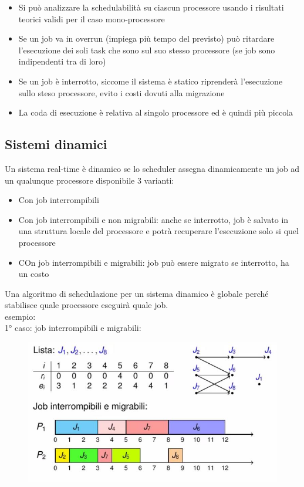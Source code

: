 \documentclass[12pt, oneside]{extbook}
\begin{document}
\begin{itemize}
\item Si può analizzare la schedulabilità su  ciascun processore usando i risultati teorici validi per il caso mono-processore
\item Se un job va in overrun (impiega più tempo del previsto) può ritardare l'esecuzione dei soli task che sono sul suo stesso processore (se job sono indipendenti tra di loro)
\item Se un job è interrotto, siccome il sistema è statico riprenderà l'esecuzione sullo steso processore, evito i costi dovuti alla migrazione
\item La coda di esecuzione è relativa al singolo processore ed è quindi più piccola
\end{itemize}
\subsection{Sistemi dinamici}
Un sistema real-time è dinamico se lo scheduler assegna dinamicamente un job ad un qualunque processore disponibile
3 varianti:
\begin{itemize}
\item Con job interrompibili
\item Con job interrompibili e non migrabili: anche se interrotto, job è salvato in una struttura locale del processore e potrà recuperare l'esecuzione solo si quel processore
\item COn job interrompibili e migrabili: job può essere migrato se interrotto, ha un costo
\end{itemize}
Una algoritmo di schedulazione per un sistema dinamico è globale perché stabilisce quale processore eseguirà quale job. \\esempio:\\
1° caso: job interrompibili e migrabili:\\
\begin{figure}[!h]
\centering
\includegraphics[scale=0.4]{immagini/image-036.jpg}
\end{figure}
\end{document}
